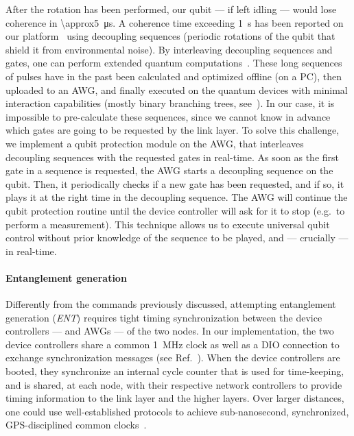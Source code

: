 After the rotation has been performed, our qubit --- if left idling --- would lose coherence in
\qty{\approx5}{\us}. A coherence time exceeding \qty{1}{s} has been reported on our
platform~\cite{abobeih_2018_one_sec} using decoupling sequences (periodic rotations of the qubit
that shield it from environmental noise). By interleaving decoupling sequences and gates, one can
perform extended quantum computations~\cite{bradley_2019_one_min}. These long sequences of pulses
have in the past been calculated and optimized offline (on a PC), then uploaded to an AWG, and
finally executed on the quantum devices with minimal interaction capabilities (mostly binary
branching trees, see~\cite{pompili_2021_multinode}). In our case, it is impossible to pre-calculate
these sequences, since we cannot know in advance which gates are going to be requested by the link
layer. To solve this challenge, we implement a {qubit protection} module on the AWG, that
interleaves decoupling sequences with the requested gates in real-time. As soon as the first gate in
a sequence is requested, the AWG starts a decoupling sequence on the qubit. Then, it periodically
checks if a new gate has been requested, and if so, it plays it at the right time in the decoupling
sequence. The AWG will continue the qubit protection routine until the device controller will ask
for it to stop (e.g.~to perform a measurement). This technique allows us to execute universal qubit
control without prior knowledge of the sequence to be played, and --- crucially --- in real-time.

\paragraph{Entanglement generation}

Differently from the commands previously discussed, attempting entanglement generation (\emph{ENT})
requires tight timing synchronization between the device controllers --- and AWGs --- of the two
nodes. In our implementation, the two device controllers share a common \qty{1}{MHz} clock as well
as a DIO connection to exchange synchronization messages (see Ref.~\cite{pompili_2021_multinode}).
When the device controllers are booted, they synchronize an internal cycle counter that is used for
time-keeping, and is shared, at each node, with their respective network controllers to provide
timing information to the link layer and the higher layers. Over larger distances, one could use
well-established protocols to achieve sub-nanosecond, synchronized, GPS-disciplined common
clocks~\cite{whiterabbit}.

